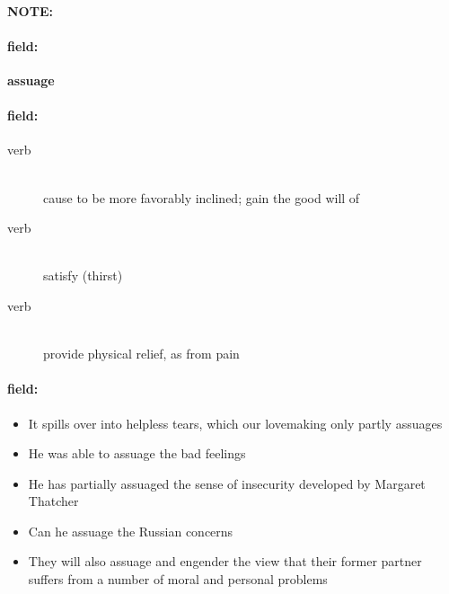 \documentclass[12pt]{article}
\newenvironment{note}{\paragraph{NOTE:}}{}
\newenvironment{field}{\paragraph{field:}}{}
\begin{document}
\begin{note}
\begin{field}
\textbf{\large assuage}
\end{field}


\begin{field}
\begin{description}
\item[verb] \hfill \\ 
cause to be more favorably inclined; gain the good will of

\item[verb] \hfill \\ 
satisfy (thirst)

\item[verb] \hfill \\ 
provide physical relief, as from pain

\end{description}
\end{field}

\begin{field}
\begin{itemize}
\item It spills over into helpless tears, which our lovemaking only partly assuages
\item He was able to assuage the bad feelings
\item He has partially assuaged the sense of insecurity developed by Margaret Thatcher
\item Can he assuage the Russian concerns
\item They will also assuage and engender the view that their former partner suffers from a number of moral and personal problems
\end{itemize}
\end{field}
\end{note}
\end{document}
